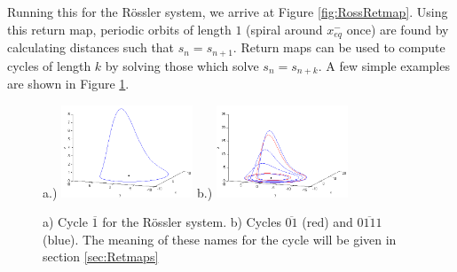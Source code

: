 \documentclass[12 pt]{article}
\begin{document}
Running this for the R\"ossler system, we arrive at Figure \ref{fig:RossRetmap}.  Using this return map, periodic orbits of length $1$ (spiral around $x_{eq}^{-}$ once) are found by calculating distances such that $s_n = s_{n+1}$.  Return maps can be used to compute cycles of length $k$ by solving those which solve $s_n = s_{n+k}$.  A few simple examples are shown in Figure \ref{fig:RossPO}.

\begin{figure}[h]
\centering
a.)  \includegraphics[width=0.35\textwidth]{Figs/Section1/kcross1cyclec.png}
b.)
  \includegraphics[width=0.35\textwidth]{Figs/Section1/kcross24cyclesc.png}
\caption{a) Cycle $\overline{1}$ for the R\"ossler system. b) Cycles $\overline{01}$ (red) and $\overline{0111}$ (blue).  The meaning of these names for the cycle will be given in section \ref{sec:Retmaps}}
 \label{fig:RossPO}
\end{figure}
\end{document}

